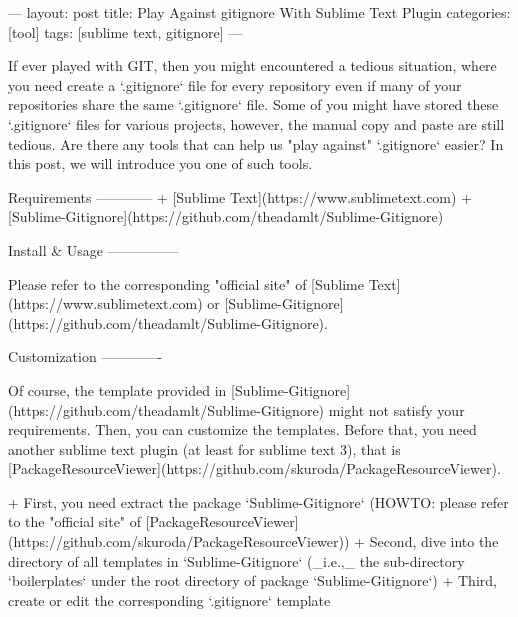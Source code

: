 ---
layout: post
title: Play Against gitignore With Sublime Text Plugin
categories: [tool]
tags: [sublime text, gitignore]
---

If ever played with GIT, then you might encountered a tedious situation, where you need create a `.gitignore` file for every repository even if many of your repositories share the same `.gitignore` file. Some of you might have stored these `.gitignore` files for various projects, however, the manual copy and paste are still tedious. Are there any tools that can help us "play against" `.gitignore` easier? In this post, we will introduce you one of such tools.

Requirements
------------
+ [Sublime Text](https://www.sublimetext.com)
+ [Sublime-Gitignore](https://github.com/theadamlt/Sublime-Gitignore)

Install & Usage
---------------

Please refer to the corresponding "official site" of [Sublime Text](https://www.sublimetext.com) or [Sublime-Gitignore](https://github.com/theadamlt/Sublime-Gitignore).


Customization
-------------

Of course, the template provided in [Sublime-Gitignore](https://github.com/theadamlt/Sublime-Gitignore) might not satisfy your requirements. Then, you can customize the templates. Before that, you need another sublime text plugin (at least for sublime text 3), that is [PackageResourceViewer](https://github.com/skuroda/PackageResourceViewer). 

+ First, you need extract the package `Sublime-Gitignore` (HOWTO: please refer to the "official site" of [PackageResourceViewer](https://github.com/skuroda/PackageResourceViewer))
+ Second, dive into the directory of all templates in `Sublime-Gitignore` (_i.e.,_ the sub-directory `boilerplates` under the root directory of package `Sublime-Gitignore`)
+ Third, create or edit the corresponding `.gitignore` template


